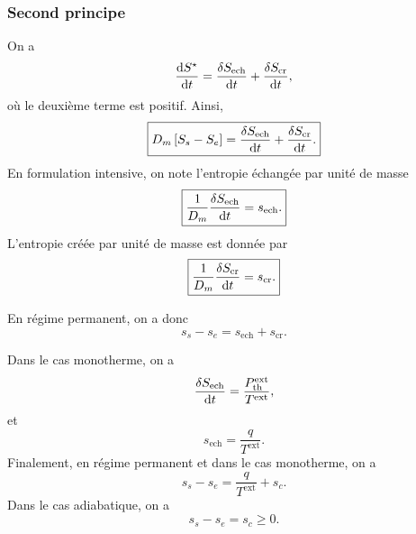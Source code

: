         \subsubsection{Second principe}
            
            On a 
            \begin{equation*}
                \frac{\mathrm{d} S^{\star}}{\mathrm{d} t}=\frac{\delta S_{\text{ech}}}{\mathrm{d} t}+\frac{\delta S_{\text{cr}}}{\mathrm{d} t},
            \end{equation*}
            où le deuxième terme est positif. Ainsi,
            \begin{equation*}
                \boxed{
                    D_m\left[S_s-S_e\right]=\frac{\delta S_{\text{ech}}}{\mathrm{d} t}+\frac{\delta S_{\text{cr}}}{\mathrm{d} t}.
                }
            \end{equation*}
            En formulation intensive, on note l'entropie échangée par unité de masse
            \begin{equation*}
                \boxed{
                    \frac{1}{D_m}\frac{\delta S_{\text{ech}}}{\mathrm{d} t}=s_{\text{ech}}.
                }
            \end{equation*}
            L'entropie créée par unité de masse est donnée par
            \begin{equation*}
                \boxed{
                    \frac{1}{D_m}\frac{\delta S_{\text{cr}}}{\mathrm{d} t}=s_{\text{cr}}.
                }
            \end{equation*}

            En régime permanent, on a donc
            \begin{equation*}
                \boxed{s_s-s_e=s_{\text{ech}}+s_{\text{cr}}}.
            \end{equation*}

            Dans le cas monotherme, on a
            \begin{equation*}
                \frac{\delta S_{\text{ech}}}{\mathrm{d} t}=\frac{P_{\text{th}}^{\text{ext}}}{T^{\text{ext}}},
            \end{equation*}
            et
            \begin{equation*}
                \boxed{
                    s_{\text{ech}}=\frac{q}{T^{\text{ext}}}.
                }
            \end{equation*}
            Finalement, en régime permanent et dans le cas monotherme, on a
            \begin{equation*}
                \boxed{
                    s_s-s_e=\frac{q}{T^{\text{ext}}}+s_c.
                }
            \end{equation*}
            Dans le cas adiabatique, on a
            \begin{equation*}
                \boxed{
                    s_s-s_e=s_c\geqslant 0.
                }
            \end{equation*}


